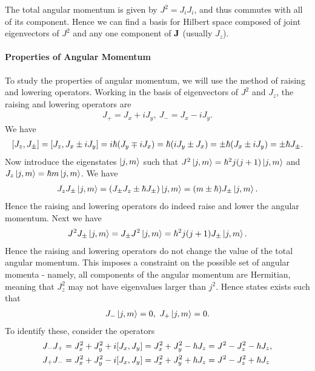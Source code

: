 The total angular momentum is given by $J^{2} = J_{i}J_{i}$, and thus commutes with all of its component. Hence we can find a basis for Hilbert space composed of joint eigenvectors of $J^{2}$ and any one component of $\vb{J}$ (usually $J_{z}$).

\paragraph{Properties of Angular Momentum}
To study the properties of angular momentum, we will use the method of raising and lowering operators. Working in the basis of eigenvectors of $J^{2}$ and $J_{z}$, the raising and lowering operators are
\begin{align*}
	J_{+} = J_{x} + iJ_{y},\ J_{-} = J_{x} - iJ_{y}.
\end{align*}
We have
\begin{align*}
	\comm{J_{z}}{J_{\pm}} = \comm{J_{z}}{J_{x} \pm iJ_{y}} = i\hbar(J_{y} \mp iJ_{x}) = \hbar(iJ_{y} \pm J_{x}) = \pm\hbar(J_{x} \pm iJ_{y}) = \pm\hbar J_{\pm}.
\end{align*}
Now introduce the eigenstates $\ket{j, m}$ such that $J^{2}\ket{j, m} = \hbar^{2}j(j + 1)\ket{j, m}$ and $J_{z}\ket{j, m} = \hbar m\ket{j, m}$. We have
\begin{align*}
	J_{z}J_{\pm}\ket{j, m} = (J_{\pm}J_{z} \pm \hbar J_{\pm})\ket{j, m} = (m \pm \hbar)J_{\pm}\ket{j, m}.
\end{align*}
Hence the raising and lowering operators do indeed raise and lower the angular momentum. Next we have
\begin{align*}
J^{2}J_{\pm}\ket{j, m} = J_{\pm}J^{2}\ket{j, m} = \hbar^{2}j(j + 1)J_{\pm}\ket{j, m}.
\end{align*}
Hence the raising and lowering operators do not change the value of the total angular momentum. This imposes a constraint on the possible set of angular momenta - namely, all components of the angular momentum are Hermitian, meaning that $J_{z}^{2}$ may not have eigenvalues larger than $j^{2}$. Hence states exists such that
\begin{align*}
	J_{-}\ket{j, m} = 0,\ J_{+}\ket{j, m} = 0.
\end{align*}
To identify these, consider the operators
\begin{align*}
	J_{-}J_{+} &= J_{x}^{2} + J_{y}^{2} + i\comm{J_{x}}{J_{y}} = J_{x}^{2} + J_{y}^{2} - \hbar J_{z} = J^{2} - J_{z}^{2} - \hbar J_{z}, \\
	J_{+}J_{-} &= J_{x}^{2} + J_{y}^{2} - i\comm{J_{x}}{J_{y}} = J_{x}^{2} + J_{y}^{2} + \hbar J_{z} = J^{2} - J_{z}^{2} + \hbar J_{z}
\end{align*}
